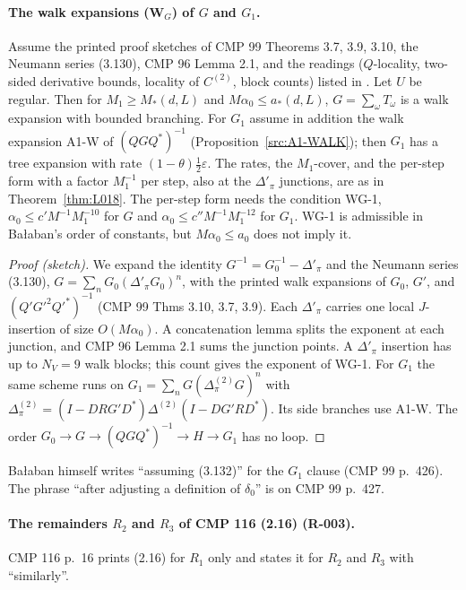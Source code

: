 \paragraph{The walk expansions (W$_G$) of $G$ and $G_1$.}

\begin{proposition}\label{src:WG}
Assume the printed proof sketches of CMP 99 Theorems 3.7, 3.9, 3.10, the Neumann series (3.130), CMP 96 Lemma 2.1, and the readings ($Q$-locality, two-sided derivative bounds, locality of $C^{(2)}$, block counts) listed in . Let $U$ be regular. Then for $M_1\ge M_*(d,L)$ and $M\alpha_0\le a_*(d,L)$, $G=\sum_\omega T_\omega$ is a walk expansion with bounded branching. For $G_1$ assume in addition the walk expansion A1-W of $(QGQ^*)^{-1}$ (Proposition~\ref{src:A1-WALK}); then $G_1$ has a tree expansion with rate $(1-\theta)\tfrac12\varepsilon$. The rates, the $M_1$-cover, and the per-step form with a factor $M_1^{-1}$ per step, also at the $\Delta'_\pi$ junctions, are as in Theorem~\ref{thm:L018}. The per-step form needs the condition WG-1, $\alpha_0\le c'M^{-1}M_1^{-10}$ for $G$ and $\alpha_0\le c''M^{-1}M_1^{-12}$ for $G_1$. WG-1 is admissible in Ba{\l}aban's order of constants, but $M\alpha_0\le a_0$ does not imply it.
\end{proposition}
\begin{proof}[Proof (sketch)]
We expand the identity $G^{-1}=G_0^{-1}-\Delta'_\pi$ and the Neumann series (3.130), $G=\sum_nG_0(\Delta'_\pi G_0)^n$, with the printed walk expansions of $G_0$, $G'$, and $(Q'G'^2Q'^*)^{-1}$ (CMP 99 Thms 3.10, 3.7, 3.9). Each $\Delta'_\pi$ carries one local $J$-insertion of size $O(M\alpha_0)$. A concatenation lemma splits the exponent at each junction, and CMP 96 Lemma 2.1 sums the junction points. A $\Delta'_\pi$ insertion has up to $N_V=9$ walk blocks; this count gives the exponent of WG-1. For $G_1$ the same scheme runs on $G_1=\sum_nG(\Delta_\pi^{(2)}G)^n$ with $\Delta_\pi^{(2)}=(I-DRG'D^*)\Delta^{(2)}(I-DG'RD^*)$. Its side branches use A1-W. The order $G_0\to G\to(QGQ^*)^{-1}\to H\to G_1$ has no loop.
\end{proof}
\begin{remark}
Ba{\l}aban himself writes ``assuming (3.132)'' for the $G_1$ clause (CMP 99 p.~426). The phrase ``after adjusting a definition of $\delta_0$'' is on CMP 99 p.~427.
\end{remark}

\paragraph{The remainders $R_2$ and $R_3$ of CMP 116 (2.16) (R-003).}
CMP 116 p.~16 prints (2.16) for $R_1$ only and states it for $R_2$ and $R_3$ with ``similarly''.

